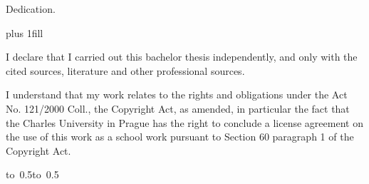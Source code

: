 \documentclass[12pt,a4paper]{report}
\let\openright=\clearpage
\begin{document}

\openright

\noindent
Dedication.

\newpage


\vglue 0pt plus 1fill

\noindent
I declare that I carried out this bachelor thesis independently, and only with the cited
sources, literature and other professional sources.

\medskip\noindent
I understand that my work relates to the rights and obligations under the Act No.
121/2000 Coll., the Copyright Act, as amended, in particular the fact that the Charles
University in Prague has the right to conclude a license agreement on the use of this
work as a school work pursuant to Section 60 paragraph 1 of the Copyright Act.

\vspace{10mm}

\hbox{\hbox to 0.5\hbox to 0.5}

\vspace{20mm}
\newpage

\end{document}
